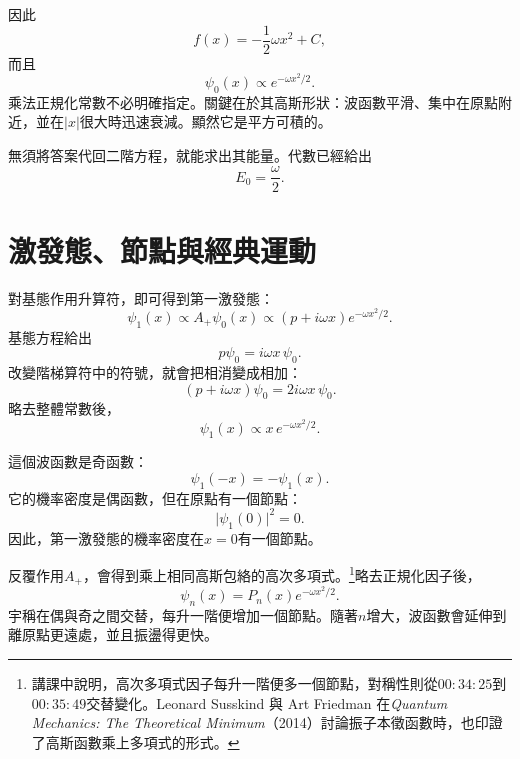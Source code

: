\begin{classroomqa}
\end{classroomqa}

因此
\begin{equation}
f(x)=-\frac12\omega x^{2}+C,
\end{equation}
而且
\begin{equation}
\psi_{0}(x)\propto e^{-\omega x^{2}/2}.
\end{equation}
乘法正規化常數不必明確指定。關鍵在於其高斯形狀：波函數平滑、集中在原點附近，並在\(\lvert x\rvert\)很大時迅速衰減。顯然它是平方可積的。

無須將答案代回二階方程，就能求出其能量。代數已經給出
\begin{equation}
E_{0}=\frac{\omega}{2}.
\end{equation}

\section{激發態、節點與經典運動}

對基態作用升算符，即可得到第一激發態：
\begin{equation}
\psi_{1}(x)\propto A_{+}\psi_{0}(x)
\propto(p+i\omega x)e^{-\omega x^{2}/2}.
\end{equation}
基態方程給出
\[
p\psi_{0}=i\omega x\,\psi_{0}.
\]
改變階梯算符中的符號，就會把相消變成相加：
\begin{equation}
(p+i\omega x)\psi_{0}
=2i\omega x\,\psi_{0}.
\end{equation}
略去整體常數後，
\begin{equation}
\psi_{1}(x)\propto x\,e^{-\omega x^{2}/2}.
\end{equation}

這個波函數是奇函數：
\begin{equation}
\psi_{1}(-x)=-\psi_{1}(x).
\end{equation}
它的機率密度是偶函數，但在原點有一個節點：
\begin{equation}
\lvert\psi_{1}(0)\rvert^{2}=0.
\end{equation}
因此，第一激發態的機率密度在\(x=0\)有一個節點。

反覆作用\(A_{+}\)，會得到乘上相同高斯包絡的高次多項式。\footnote{講課中說明，高次多項式因子每升一階便多一個節點，對稱性則從\(00{:}34{:}25\)到\(00{:}35{:}49\)交替變化。Leonard Susskind 與 Art Friedman 在\emph{Quantum Mechanics: The Theoretical Minimum}（2014）討論振子本徵函數時，也印證了高斯函數乘上多項式的形式。}略去正規化因子後，
\begin{equation}
\psi_{n}(x)=P_{n}(x)e^{-\omega x^{2}/2}.
\end{equation}
宇稱在偶與奇之間交替，每升一階便增加一個節點。隨著\(n\)增大，波函數會延伸到離原點更遠處，並且振盪得更快。

